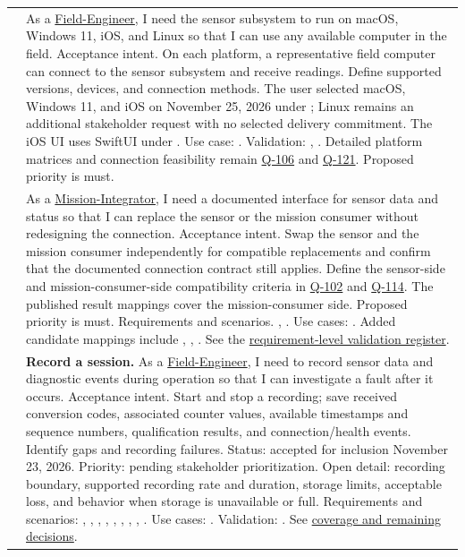 \begin{tabularx}{\linewidth}{L{1.8cm}Y}
 & As a \hyperref[Stakeholder:Field-Engineer]{Field-Engineer}, I need the sensor subsystem to run on macOS, Windows 11, iOS, and Linux so that I can use any available computer in the field. Acceptance intent. On each platform, a representative field computer can connect to the sensor subsystem and receive readings. Define supported versions, devices, and connection methods. The user selected macOS, Windows 11, and iOS on November 25, 2026 under ; Linux remains an additional stakeholder request with no selected delivery commitment. The iOS UI uses SwiftUI under . Use case: . Validation: , . Detailed platform matrices and connection feasibility remain \hyperref[Question:Q-106]{Q-106} and \hyperref[Question:Q-121]{Q-121}. Proposed priority is \gls{must}.\\
 & As a \hyperref[Stakeholder:Mission-Integrator]{Mission-Integrator}, I need a documented interface for sensor data and status so that I can replace the sensor or the mission consumer without redesigning the connection. Acceptance intent. Swap the sensor and the mission consumer independently for compatible replacements and confirm that the documented connection contract still applies. Define the sensor-side and mission-consumer-side compatibility criteria in \hyperref[Question:Q-102]{Q-102} and \hyperref[Question:Q-114]{Q-114}. The published result mappings cover the mission-consumer side. Proposed priority is \gls{must}. Requirements and scenarios. , . Use cases: . Added candidate mappings include , , . See the \hyperref[Table:ValidationRegister]{requirement-level validation register}.\\
 & \textbf{Record a session.} As a \hyperref[Stakeholder:Field-Engineer]{Field-Engineer}, I need to record sensor data and diagnostic events during operation so that I can investigate a fault after it occurs. Acceptance intent. Start and stop a recording; save received conversion codes, associated counter values, available timestamps and sequence numbers, qualification results, and connection/health events. Identify gaps and recording failures. Status: accepted for inclusion November 23, 2026. Priority: pending stakeholder prioritization. Open detail: recording boundary, supported recording rate and duration, storage limits, acceptable loss, and behavior when storage is unavailable or full. Requirements and scenarios: , , , , , , , , . Use cases: . Validation: . See \hyperref[Section:RecordingPlaybackTraceGaps]{coverage and remaining decisions}.\\

\end{tabularx}
